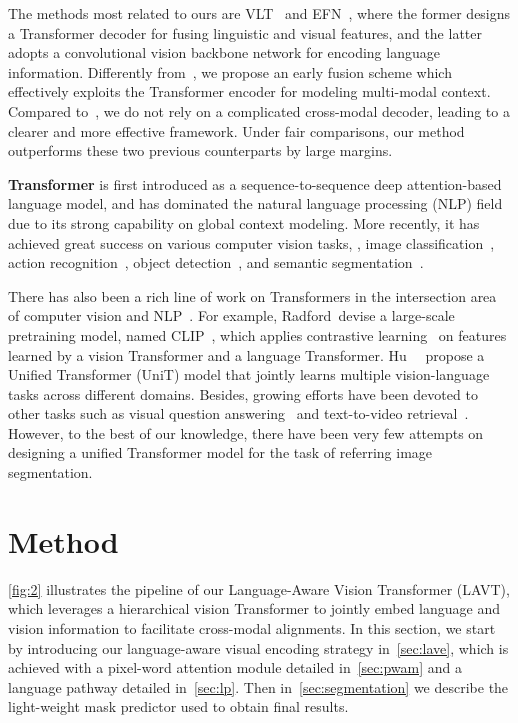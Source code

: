 \documentclass[10pt,twocolumn,letterpaper]{article}
\begin{document}
The methods most related to ours are VLT~\cite{Ding_2021_vlt} and EFN~\cite{EFN}, where the former designs a Transformer decoder for fusing linguistic and visual features, and the latter adopts a convolutional vision backbone network for encoding language information.
Differently from~\cite{Ding_2021_vlt}, we propose an early fusion scheme which effectively exploits the Transformer encoder for modeling multi-modal context.
Compared to~\cite{EFN}, we do not rely on a complicated cross-modal decoder, leading to a clearer and more effective framework.
Under fair comparisons, our method outperforms these two previous counterparts by large margins.

\noindent \textbf{Transformer}
is first introduced as a sequence-to-sequence deep attention-based language model\cite{attention-all-you-need}, and has dominated the natural language processing (NLP) field~\cite{bert,dai2019transformer,Yang2019xlnet} due to its strong capability on global context modeling.
More recently, it has achieved great success on various computer vision tasks, \eg, image classification~\cite{dosovitskiy2021vit, deit, Liu_2021_swin}, action recognition~\cite{arnab2021vivit, videoswin}, object detection~\cite{detr, Deformable_DETR, Liu_2021_swin}, and semantic segmentation~\cite{Liu_2021_swin, zheng2021rethinking,Segmenter}.

There has also been a rich line of work on Transformers in the intersection area of computer vision and NLP~\cite{rao2021denseclip,kamath2021mdetr}.
For example, Radford~\etal devise a large-scale pretraining model, named CLIP~\cite{clip}, which applies contrastive learning~\cite{hadsell2006dimensionality,sohn2016improved,he2020momentum} on features learned by a vision Transformer and a language Transformer.
Hu~\etal~\cite{hu2021unit} propose a Unified Transformer (UniT) model that jointly learns multiple vision-language tasks across different domains.
Besides, growing efforts have been devoted to other tasks such as visual question answering~\cite{ViLBERT} and text-to-video retrieval~\cite{clipbert}.
However, to the best of our knowledge, there have been very few attempts on designing a unified Transformer model for the task of referring image segmentation.
 \section{Method}
\label{sec:method}
\cref{fig:2} illustrates the pipeline of our Language-Aware Vision Transformer (LAVT), which leverages a hierarchical vision Transformer to jointly embed language and vision information to facilitate cross-modal alignments.
In this section, we start by introducing our language-aware visual encoding strategy in~\cref{sec:lave}, which is achieved with a pixel-word attention module detailed in~\cref{sec:pwam} and a language pathway detailed in~\cref{sec:lp}.
Then in~\cref{sec:segmentation} we describe the light-weight mask predictor used to obtain final results.
\end{document}
